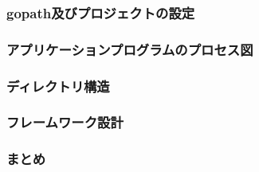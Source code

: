 
\subsubsection{gopath及びプロジェクトの設定}

\subsubsection{アプリケーションプログラムのプロセス図}

\subsubsection{ディレクトリ構造}

\subsubsection{フレームワーク設計}

\subsubsection{まとめ}

